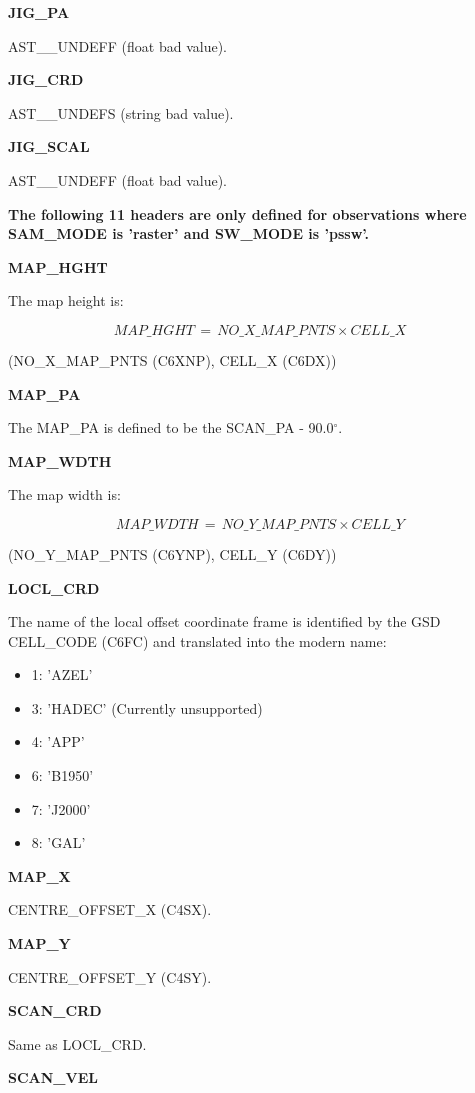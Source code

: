 \documentclass[twoside,11pt,nolof]{starlink}
\providecommand{\cellCode}{CELL\_CODE (C6FC)}
\providecommand{\cellX}{CELL\_X (C6DX)}
\providecommand{\cellY}{CELL\_Y (C6DY)}
\providecommand{\centreOffsetX}{CENTRE\_OFFSET\_X (C4SX)}
\providecommand{\centreOffsetY}{CENTRE\_OFFSET\_Y (C4SY)}
\providecommand{\nMapPtsX}{NO\_X\_MAP\_PNTS (C6XNP)}
\providecommand{\nMapPtsY}{NO\_Y\_MAP\_PNTS (C6YNP)}
\begin{document}
\textbf{JIG\_PA}

AST\_\_UNDEFF (float bad value).

\textbf{JIG\_CRD}

AST\_\_UNDEFS (string bad value).

\textbf{JIG\_SCAL}

AST\_\_UNDEFF (float bad value).

\textbf{The following 11 headers are only defined for observations where SAM\_MODE is 'raster' and SW\_MODE is 'pssw'. }

\textbf{MAP\_HGHT}

The map height is:

\begin{equation}
MAP\_HGHT \,=\, NO\_X\_MAP\_PNTS \times CELL\_X
\end{equation}

(\nMapPtsX, \cellX)

\textbf{MAP\_PA}

The MAP\_PA is defined to be the SCAN\_PA - 90.0$^{\circ}$.

\textbf{MAP\_WDTH}

The map width is:

\begin{equation}
MAP\_WDTH \,=\, NO\_Y\_MAP\_PNTS \times CELL\_Y
\end{equation}

(\nMapPtsY, \cellY)

\textbf{LOCL\_CRD}

The name of the local offset coordinate frame is identified by the GSD \cellCode{} and translated into the modern name:

\begin{itemize}
\item 1: 'AZEL'
\item 3: 'HADEC' (Currently unsupported)
\item 4: 'APP'
\item 6: 'B1950'
\item 7: 'J2000'
\item 8: 'GAL'
\end{itemize}

\textbf{MAP\_X}

\centreOffsetX.

\textbf{MAP\_Y}

\centreOffsetY.

\textbf{SCAN\_CRD}

Same as LOCL\_CRD.

\textbf{SCAN\_VEL}
\end{document}
